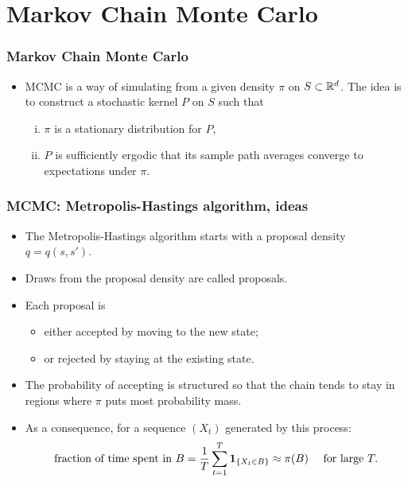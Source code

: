 \documentclass[xcolor=table,10pt]{beamer}
\begin{document}
\section{Markov Chain Monte Carlo}

\begin{frame}
  \frametitle{Markov Chain Monte Carlo}
  \begin{itemize}
  \item MCMC is a way of simulating from a given density $\pi$ on
    $S\subset{\mathbb{R}}^d$. The idea is to construct a stochastic kernel $P$
    on  $S$ such that
    \begin{enumerate}[(i)]
    \item $\pi$ is a stationary distribution for $P$,
    \item $P$ is sufficiently ergodic that its sample path averages
      converge to expectations under $\pi$. 
    \end{enumerate}
  \end{itemize}
\end{frame}

\begin{frame}
  \frametitle{MCMC: Metropolis-Hastings algorithm, ideas} 
  \begin{itemize}
  \item The \alert{Metropolis-Hastings algorithm} starts with a
    \alert{proposal density} $q=q(s,s')$. 
  \item Draws from the proposal density are called 
    \alert{proposals}.
  \item Each proposal is
    \begin{itemize}
    \item either \alert{accepted} by moving to the new state;
    \item or \alert{rejected} by staying at the existing state.
    \end{itemize}
  \item The probability of accepting is structured so that the chain
    tends to stay in regions where $\pi$ puts most probability mass.
  \item As a consequence, for a sequence $(X_t)$ generated by this
    process: 
\begin{equation*}
  \text{fraction of time spent in $B$} = \frac{1}{T}\sum_{t=1}^T
  \mathbf{1}_{\{X_t\in B\}} \approx \pi(B)\quad \text{ for large }T. 
\end{equation*}
\end{itemize}
\end{frame}
\end{document}
